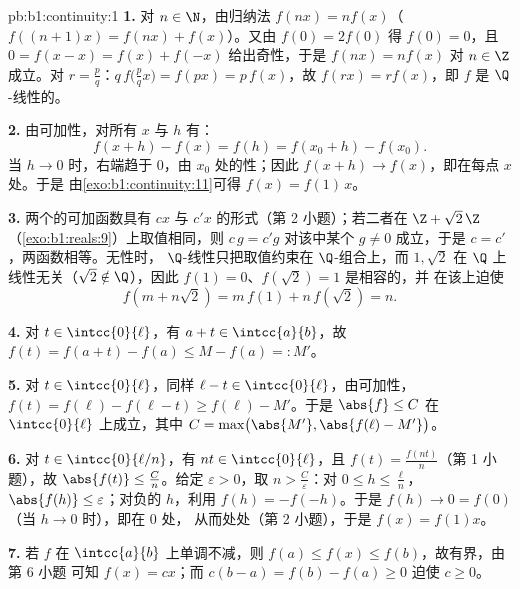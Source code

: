 \begin{solution}{pb:b1:continuity:1}
\textbf{1.} 对 $n \in \N$，由归纳法 $f(nx) = n f(x)$（
$f((n+1)x) = f(nx) + f(x)$）。又由 $f(0) = 2f(0)$ 得 $f(0) =
0$，且 $0 = f(x - x) = f(x) + f(-x)$ 给出奇性，于是 $f(nx) =
nf(x)$ 对 $n \in \Z$ 成立。对 $r = \frac pq$：$q\,f\bigl(\tfrac
pq x\bigr) = f(px) = p\,f(x)$，故 $f(rx) = r f(x)$，即 $f$ 是
$\Q$-线性的。

\textbf{2.} 由可加性，对所有 $x$ 与 $h$ 有：
\[
f(x + h) - f(x) = f(h) = f(x_0 + h) - f(x_0) .
\]
当 $h \to 0$ 时，右端趋于 $0$，由
$x_0$ 处的性；因此 $f(x + h) \to f(x)$，即在每点 $x$ 处。于是
由\cref{exo:b1:continuity:11}可得 $f(x) = f(1)\,x$。

\textbf{3.} 两个的可加函数具有
$cx$ 与 $c'x$ 的形式（第 2 小题）；若二者在
$\Z + \sqrt2\,\Z$（\cref{exo:b1:reals:9}）上取值相同，则 $c\,g = c'g$
对该中某个 $g \neq 0$ 成立，于是 $c = c'$，两函数相等。无性时，
$\Q$-线性只把取值约束在
$\Q$-组合上，而 $1, \sqrt2$ 在 $\Q$ 上线性无关（$\sqrt2
\notin \Q$），因此 $f(1) = 0$、$f(\sqrt2) = 1$ 是相容的，并
在该上迫使
\[
f(m + n\sqrt2) = m\,f(1) + n\,f(\sqrt2) = n .
\]

\textbf{4.} 对 $t \in \intcc{0}{\ell}$，有 $a + t \in
\intcc{a}{b}$，故 $f(t) = f(a + t) - f(a) \leq M - f(a) =: M'$。

\textbf{5.} 对 $t \in \intcc{0}{\ell}$，同样 $\ell - t \in
\intcc{0}{\ell}$，由可加性，$f(t) = f(\ell) - f(\ell
- t) \geq f(\ell) - M'$。于是 $\abs{f} \leq C$ 在
$\intcc{0}{\ell}$ 上成立，其中 $C = \max\bigl(\abs{M'}, \abs{f(\ell) -
M'}\bigr)$。

\textbf{6.} 对 $t \in \intcc{0}{\ell/n}$，有 $nt \in
\intcc{0}{\ell}$，且 $f(t) = \frac{f(nt)}{n}$（第 1 小题），故
$\abs{f(t)} \leq \frac Cn$。给定 $\varepsilon > 0$，取 $n >
\frac C\varepsilon$：对 $0 \leq h \leq \frac\ell n$，
$\abs{f(h)} \leq \varepsilon$；对负的 $h$，利用 $f(h) =
-f(-h)$。于是 $f(h) \to 0 = f(0)$（当 $h \to 0$ 时），即在 $0$ 处，
从而处处（第 2 小题），于是 $f(x) = f(1)x$。

\textbf{7.} 若 $f$ 在 $\intcc{a}{b}$ 上单调不减，则
$f(a) \leq f(x) \leq f(b)$，故有界，由第 6 小题
可知 $f(x) = cx$；而 $c(b - a) = f(b) - f(a) \geq 0$ 迫使 $c
\geq 0$。


\end{solution}
